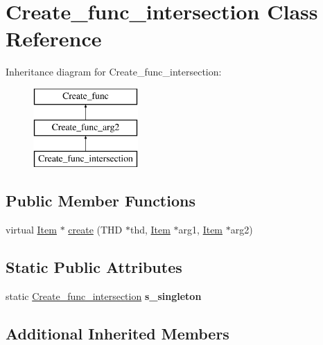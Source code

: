 \hypertarget{classCreate__func__intersection}{}\section{Create\+\_\+func\+\_\+intersection Class Reference}
\label{classCreate__func__intersection}
Inheritance diagram for Create\+\_\+func\+\_\+intersection\+:\begin{figure}[H]
\begin{center}
\leavevmode
\includegraphics[height=3.000000cm]{classCreate__func__intersection}
\end{center}
\end{figure}
\subsection*{Public Member Functions}
\begin{DoxyCompactItemize}
\item 
virtual \mbox{\hyperlink{classItem}{Item}} $\ast$ \mbox{\hyperlink{classCreate__func__intersection_a689d921047ce2a07cb2f9515ccd7eb2f}{create}} (T\+HD $\ast$thd, \mbox{\hyperlink{classItem}{Item}} $\ast$arg1, \mbox{\hyperlink{classItem}{Item}} $\ast$arg2)
\end{DoxyCompactItemize}
\subsection*{Static Public Attributes}
\begin{DoxyCompactItemize}
\item 
\mbox{\label{classCreate__func__intersection_a96147755161274f3b7b4be53d0e92366}} 
static \mbox{\hyperlink{classCreate__func__intersection}{Create\+\_\+func\+\_\+intersection}} {\bfseries s\+\_\+singleton}
\end{DoxyCompactItemize}
\subsection*{Additional Inherited Members}


